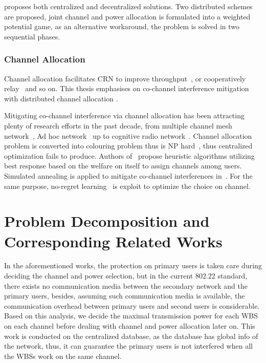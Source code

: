 \cite{joint_power_channel_linkpair_08ICT} proposes both centralized and decentralized solutions.
Two distributed schemes are proposed, joint channel and power allocation is formulated into a weighted potential game, as an alternative workaround, the problem is solved in two sequential phases.


\subsubsection*{Channel Allocation}

Channel allocation facilitates CRN to improve throughput~\cite{channelAllocation_throughput_12wcnc}, or cooperatively relay~\cite{channelAllocation_relay_2010ICASSP} and so on.
This thesis emphasises on co-channel interference mitigation with distributed channel allocation . 

Mitigating co-channel interference via channel allocation has been attracting plenty of research efforts in the past decade, from multiple channel mesh network~\cite{Hyacinth}, Ad hoc network~\cite{Ko_DistributedCA} up to cognitive radio network~\cite{SA_CA_TVWS_2012crowncom,qlearning_huang}. 
Channel allocation problem is converted into colouring problem thus is NP hard~\cite{Hyacinth}, thus centralized optimization fails to produce.
Authors of~\cite{Ko_DistributedCA} propose heuristic algorithms utilizing best response based on the welfare on itself to assign channels among users.
Simulated annealing is applied to mitigate co-channel interferences in~\cite{SA_CA_TVWS_2012crowncom}.
For the same purpose, no-regret learning~\cite{qlearning_huang, hart00correlatedeq} is exploit to optimize the choice on channel.



\section{Problem Decomposition and Corresponding Related Works}
In the aforementioned works, the protection on primary users is taken care during deciding the channel and power selection, but in the current 802.22 standard, there exists no communication media between the secondary network and the primary users, besides, assuming such communication media is available, the communication overhead between primary users and second users is considerable.
Based on this analysis, we decide the maximal transmission power for each WBS on each channel before dealing with channel and power allocation later on.
This work is conducted on the centralized database, as the database has global info of the network, thus, it can guarantee the primary users is not interfered when all the WBSs work on the same channel.

